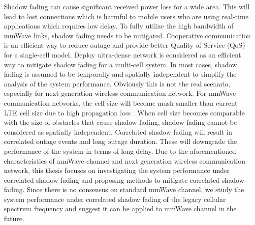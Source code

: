 \par Shadow fading can cause significant received power loss for a wide area. This will lead to lost connections which is harmful to mobile users who are using real-time applications which requires low delay. To fully utilize the high bandwidth of mmWave links, shadow fading needs to be mitigated. Cooperative communication is an efficient way to reduce outage and provide better Quality of Service (QoS) for a single-cell model. Deploy ultra-dense network is considered as an efficient way to mitigate shadow fading for a multi-cell system. In most cases, shadow fading is assumed to be temporally and spatially independent to simplify the analysis of the system performance. Obviously this is not the real scenario, especially for next generation wireless communication network. For mmWave communication networks, the cell size will become mush smaller than current LTE cell size due to high propagation loss \cite{rangan2014millimeter}. When cell size becomes comparable with the size of obstacles that cause shadow fading, shadow fading cannot be considered as spatially independent. Correlated shadow fading will result in correlated outage events and long outage duration. These will downgrade the performance of the system in terms of long delay. Due to the aforementioned characteristics of mmWave channel and next generation wireless communication network, this thesis focuses on investigating the system performance under correlated shadow fading and proposing methods to mitigate correlated shadow fading. Since there is no consensus on standard mmWave channel, we study the system performance under correlated shadow fading of the legacy cellular spectrum frequency and suggest it can be applied to mmWave channel in the future. 


